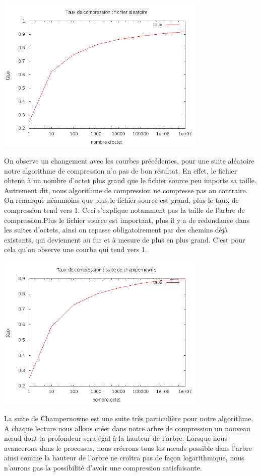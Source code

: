 \documentclass{report}
\begin{document}
\begin{center}
\includegraphics[width=10cm]{LZAleatoire.png}
\end{center}

On observe un changement avec les courbes précédentes, pour une suite aléatoire notre algorithme de compression n'a pas de bon résultat. En effet, le fichier obtenu à un nombre d'octet plus grand que le fichier source peu importe sa taille. Autrement dit, nous algorithme de compression ne compresse pas au contraire. 
On remarque néanmoins que plus le fichier source est grand, plus le taux de compression tend vers 1. Ceci s'explique notamment pas la taille de l'arbre de compression.Plus le fichier source est important, plus il y a de redondance dans les suites d'octets, ainsi on repasse obligatoirement par des chemins déjà existants, qui deviennent au fur et à mesure de plus en plus grand. 
C'est pour cela qu'on observe une courbe qui tend vers 1. 


\begin{center}
\includegraphics[width=10cm]{champLZ.png}
\end{center}
La suite de Champernowne est une suite très particulière pour notre algorithme. A chaque lecture nous allons créer dans notre arbre de compression un nouveau nœud dont la profondeur sera égal à la hauteur de l'arbre. Lorsque nous avancerons dans le processus, nous créerons tous les nœuds possible dans l'arbre ainsi comme la hauteur de l'arbre ne croîtra pas de façon logarithmique, nous n'aurons pas la possibilité d'avoir une compression satisfaisante. 
\end{document}
